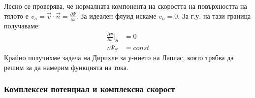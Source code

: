 Лесно се проверява, че нормалната компонента на скоростта на повърхността на тялото е $v_n = \vec{v} \cdot \vec{n} = \frac{\partial \Psi}{\partial s}$. За идеален флуид искаме $v_n =0$. За г.у. на тази граница получаваме:
\begin{align*}
    \frac{\partial \Psi}{\partial s}\big|_{S} &= 0 \\
    \therefore \Psi_S  &= const
\end{align*}
Крайно получихме задача на Дирихле за у-нието на Лаплас, която трябва да решим за да намерим функцията на тока. 

\subsubsection{Комплексен потенциал и комплексна скорост}
